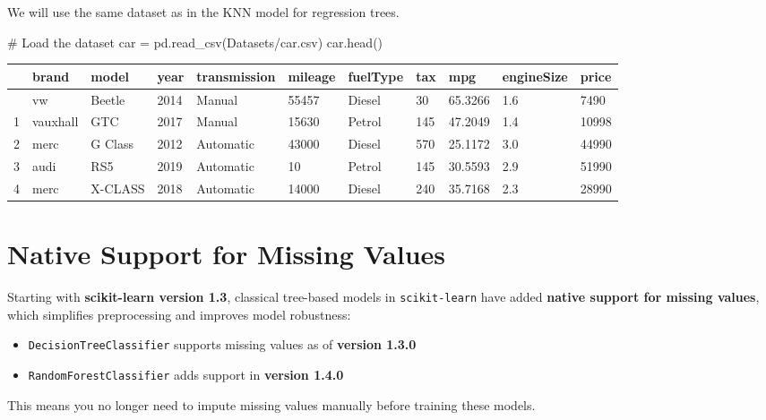 \documentclass[
  letterpaper,
  DIV=11,
  numbers=noendperiod]{scrreprt}
\newenvironment{Shaded}{\begin{snugshade}}{\end{snugshade}}
\newcommand{\CommentTok}[1]{\textcolor[rgb]{0.37,0.37,0.37}{#1}}
\newcommand{\NormalTok}[1]{\textcolor[rgb]{0.00,0.23,0.31}{#1}}
\newcommand{\OperatorTok}[1]{\textcolor[rgb]{0.37,0.37,0.37}{#1}}
\newcommand{\StringTok}[1]{\textcolor[rgb]{0.13,0.47,0.30}{#1}}
\providecommand{\tightlist}{%
  \setlength{\itemsep}{0pt}\setlength{\parskip}{0pt}}\usepackage{longtable,booktabs,array}
\begin{document}
We will use the same dataset as in the KNN model for regression trees.

\begin{Shaded}
\begin{Highlighting}[]
\CommentTok{\# Load the dataset}
\NormalTok{car }\OperatorTok{=}\NormalTok{ pd.read\_csv(}\StringTok{\textquotesingle{}Datasets/car.csv\textquotesingle{}}\NormalTok{)}
\NormalTok{car.head()}
\end{Highlighting}
\end{Shaded}

\begin{longtable}[]{@{}lllllllllll@{}}
\toprule\noalign{}
& brand & model & year & transmission & mileage & fuelType & tax & mpg &
engineSize & price \\
\midrule\noalign{}
\endhead
\bottomrule\noalign{}
\endlastfoot
0 & vw & Beetle & 2014 & Manual & 55457 & Diesel & 30 & 65.3266 & 1.6 &
7490 \\
1 & vauxhall & GTC & 2017 & Manual & 15630 & Petrol & 145 & 47.2049 &
1.4 & 10998 \\
2 & merc & G Class & 2012 & Automatic & 43000 & Diesel & 570 & 25.1172 &
3.0 & 44990 \\
3 & audi & RS5 & 2019 & Automatic & 10 & Petrol & 145 & 30.5593 & 2.9 &
51990 \\
4 & merc & X-CLASS & 2018 & Automatic & 14000 & Diesel & 240 & 35.7168 &
2.3 & 28990 \\
\end{longtable}

\section{Native Support for Missing
Values}\label{native-support-for-missing-values}

Starting with \textbf{scikit-learn version 1.3}, classical tree-based
models in \texttt{scikit-learn} have added \textbf{native support for
missing values}, which simplifies preprocessing and improves model
robustness:

\begin{itemize}
\tightlist
\item
  \texttt{DecisionTreeClassifier} supports missing values as of
  \textbf{version 1.3.0}\\
\item
  \texttt{RandomForestClassifier} adds support in \textbf{version 1.4.0}
\end{itemize}

This means you no longer need to impute missing values manually before
training these models.
\end{document}
